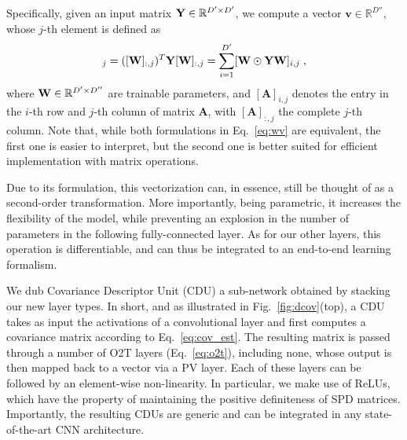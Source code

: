 Specifically, given an input matrix ${\bf Y} \in \mathbb{R}^{D' \times D'}$, we compute a vector $\mathbf{v} \in \mathbb{R}^{D''}$, whose $j$-th element is defined as
\begin{equation}
[\mathbf{v}]_j = ([{\bf W}]_{:,j})^T {\bf Y} [{\bf W}]_{:,j}  = \sum_{i=1}^{D'}
[{\bf W} \odot {\bf Y} {\bf W}]_{i,j}\;,
\label{eq:wv}
\end{equation}
where ${\bf W} \in \mathbb{R}^{D' \times D''}$ are trainable parameters, and $[\mathbf{A}]_{i,j}$ denotes the entry in the $i$-th row and $j$-th column of matrix $\mathbf{A}$, with $[\mathbf{A}]_{:,j}$ the complete $j$-th column. Note that, while both formulations in Eq.~\ref{eq:wv} are equivalent, the first one is easier to interpret, but the second one is better suited for efficient implementation with matrix operations.

Due to its formulation, this vectorization can, in essence, still be thought of as a second-order transformation. More importantly, being parametric, it increases the flexibility of the model, while preventing an explosion in the number of parameters in the following fully-connected layer. As for our other layers, this operation is differentiable, and can thus be integrated to an end-to-end learning formalism.

We dub Covariance Descriptor Unit (CDU) a sub-network obtained by stacking our new layer types.
In short, and as illustrated in Fig.~\ref{fig:dcov}(top), a CDU takes as input the activations of a convolutional layer and first computes a covariance matrix according to Eq.~\ref{eq:cov_est}. The resulting matrix is passed through a number of O2T layers (Eq.~\ref{eq:o2t}), including none, whose output is then mapped back to a vector via a PV layer. Each of these layers can be followed by an element-wise non-linearity. In particular, we make use of ReLUs, which have the property of maintaining the positive definiteness of SPD matrices. Importantly, the resulting CDUs are generic and can be integrated in any state-of-the-art CNN architecture.

